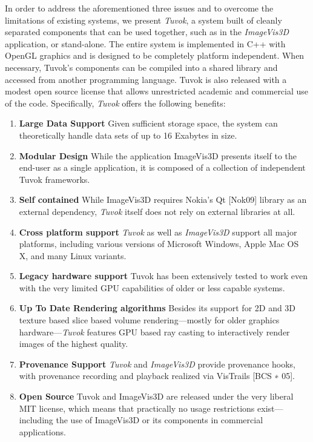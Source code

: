 In order to address the aforementioned three issues and to overcome the
limitations of existing systems, we present \textit{Tuvok}, a system
built of cleanly separated components that can
be used together, such as in the \textit{ImageVis3D} application,
or stand-alone. The entire system is implemented in C++ with OpenGL
graphics and is designed to be completely platform independent. When
necessary, Tuvok's components can be compiled into a shared library
and accessed from another programming language. Tuvok is also released
with a modest open source license that allows unrestricted academic and
commercial use of the code. Specifically,
\textit{Tuvok} offers the following benefits:

\begin{enumerate}

\item \textbf{Large Data Support}
Given sufficient storage space, the system can theoretically
handle data sets of up to 16 Exabytes in size.
\item \textbf{Modular Design}
While the application ImageVis3D presents itself to the
end-user as a single application, it is composed of a
collection of independent Tuvok frameworks.
\item \textbf{Self contained}
While ImageVis3D requires Nokia's Qt [Nok09] library
as an external dependency, \textit{Tuvok} itself does not rely on
external libraries at all.
\item \textbf{Cross platform support}
\textit{Tuvok} as well as \textit{ImageVis3D} support all major platforms,
including various versions of Microsoft Windows, Apple
Mac OS X, and many Linux variants.
\item \textbf{Legacy hardware support}
Tuvok has been extensively tested to work even with the
very limited GPU capabilities of older or less capable
systems.
\item \textbf{Up To Date Rendering algorithms}
Besides its support for 2D and 3D texture based slice
based volume rendering---mostly for older graphics
hardware---\textit{Tuvok} features GPU based ray casting to
interactively render images of the highest quality.
\item \textbf{Provenance Support}
\textit{Tuvok} and \textit{ImageVis3D} provide provenance hooks, with
provenance recording and playback realized via VisTrails
[BCS ∗ 05].
\item \textbf{Open Source}
Tuvok and ImageVis3D are released under the very liberal
MIT license, which means that practically no usage
restrictions exist---including the use of ImageVis3D or its
components in commercial applications.

\end{enumerate}

